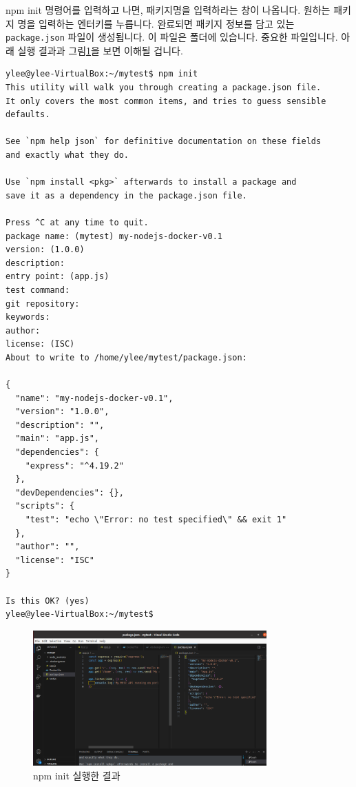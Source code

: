 \documentclass{article}
\begin{document}
npm init 명령어를 입력하고 나면, 패키지명을 입력하라는 창이 나옵니다. 원하는 패키지 명을 입력하는 엔터키를 누릅니다. 완료되면 패키지 정보를 담고 있는 \texttt{package.json} 파일이 생성됩니다. 이 파일은 폴더에 있습니다. 중요한 파일입니다. 아래 실행 결과과 그림\ref{fig:npminit}을 보면 이해될 겁니다. 

\begin{lstlisting}[language=Shell, caption={npm init 실행 예제}]
ylee@ylee-VirtualBox:~/mytest$ npm init
This utility will walk you through creating a package.json file.
It only covers the most common items, and tries to guess sensible defaults.

See `npm help json` for definitive documentation on these fields
and exactly what they do.

Use `npm install <pkg>` afterwards to install a package and
save it as a dependency in the package.json file.

Press ^C at any time to quit.
package name: (mytest) my-nodejs-docker-v0.1
version: (1.0.0) 
description: 
entry point: (app.js) 
test command: 
git repository: 
keywords: 
author: 
license: (ISC) 
About to write to /home/ylee/mytest/package.json:

{
  "name": "my-nodejs-docker-v0.1",
  "version": "1.0.0",
  "description": "",
  "main": "app.js",
  "dependencies": {
    "express": "^4.19.2"
  },
  "devDependencies": {},
  "scripts": {
    "test": "echo \"Error: no test specified\" && exit 1"
  },
  "author": "",
  "license": "ISC"
}

Is this OK? (yes) 
ylee@ylee-VirtualBox:~/mytest$ 

\end{lstlisting}

\begin{figure}[htb]
  \centering
  \includegraphics[width=0.8\textwidth]{images/npminit.png}
  \caption{npm init 실행한 결과}
  \label{fig:npminit}
\end{figure}
\end{document}

